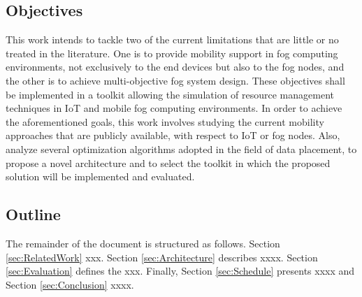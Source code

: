 \subsection{Objectives}\label{subsec:Objectives}
\noindent This work intends to tackle two of the current limitations that are little or no treated in the literature. One is to provide mobility support in fog computing environments, not exclusively to the end devices but also to the fog nodes, and the other is to achieve multi-objective fog system design. These objectives shall be implemented in a toolkit allowing the simulation of resource management techniques in IoT and mobile fog computing environments. In order to achieve the aforementioned goals, this work involves studying the current mobility approaches that are publicly available, with respect to IoT or fog nodes. Also, analyze several optimization algorithms adopted in the field of data placement, to propose a novel architecture and to select the toolkit in which the proposed solution will be implemented and evaluated.
\subsection{Outline}\label{subsec:Outline}
\noindent The remainder of the document is structured as follows. Section
\ref{sec:RelatedWork} xxx. Section \ref{sec:Architecture} describes xxxx.
Section \ref{sec:Evaluation} defines the xxx. Finally, Section
\ref{sec:Schedule} presents xxxx and Section \ref{sec:Conclusion} xxxx.